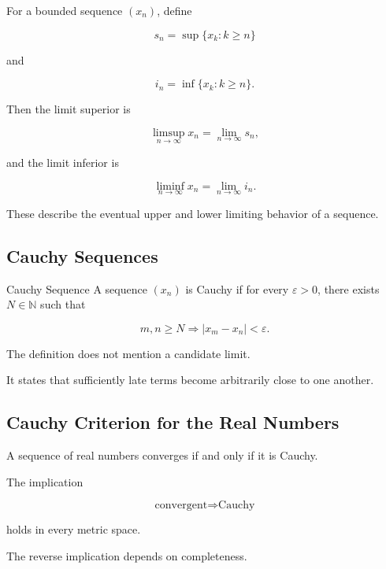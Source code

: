 For a bounded sequence \((x_n)\), define

\[
s_n
=
\sup\{x_k:k\geq n\}
\]

and

\[
i_n
=
\inf\{x_k:k\geq n\}.
\]

Then the limit superior is

\[
\boxed{
\limsup_{n\to\infty}x_n
=
\lim_{n\to\infty}s_n,
}
\]

and the limit inferior is

\[
\boxed{
\liminf_{n\to\infty}x_n
=
\lim_{n\to\infty}i_n.
}
\]

These describe the eventual upper and lower limiting behavior of a
sequence.

\subsection{Cauchy Sequences}
\label{subsec:cauchy-sequences}

\begin{definitionbox}{Cauchy Sequence}
A sequence \((x_n)\) is Cauchy if for every \(\varepsilon>0\), there exists
\(N\in\mathbb{N}\) such that

\[
\boxed{
m,n\geq N
\Longrightarrow
|x_m-x_n|<\varepsilon.
}
\]
\end{definitionbox}

The definition does not mention a candidate limit.

It states that sufficiently late terms become arbitrarily close to one
another.

\subsection{Cauchy Criterion for the Real Numbers}
\label{subsec:cauchy-criterion-real}

\begin{theorem}
A sequence of real numbers converges if and only if it is Cauchy.
\end{theorem}

The implication

\[
\text{convergent}
\Longrightarrow
\text{Cauchy}
\]

holds in every metric space.

The reverse implication depends on completeness.

